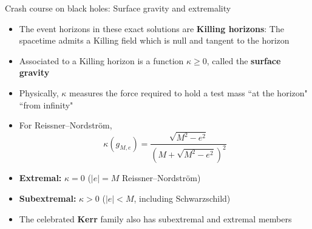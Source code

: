 \documentclass[compress,usenames,dvipsnames,8pt]{beamer}
\theoremstyle{definition}
\renewcommand{\(}{\begin{columns}}
\renewcommand{\)}{\end{columns}}
\newcommand{\<}[1]{\begin{column}{#1}}
\renewcommand{\>}{\end{column}}
\begin{document}






\begin{frame}{Crash course on black holes: Surface gravity and extremality}

\begin{itemize}
\item The event horizons in these exact solutions are \textbf{Killing horizons}: The spacetime admits a Killing field which is null and tangent to the horizon \pause

\item Associated to a Killing horizon is a function $\kappa\ge 0$, called the \textbf{surface gravity} \pause

\item Physically, $\kappa$ measures the force required to hold a test mass ``at the horizon" ``from infinity" \pause


\item For Reissner--Nordstr\"om, 
\[\kappa(g_{M,e})=\frac{\sqrt{M^2-e^2}}{(M+\sqrt{M^2-e^2})^2}\] \pause

\item \textbf{Extremal:} $\kappa = 0$ ($|e|=M$ Reissner--Nordstr\"om)

\item \textbf{Subextremal:} $\kappa>0$ ($|e|<M$, including Schwarzschild) \pause

\item The celebrated \textbf{Kerr} family also has subextremal and extremal members
\end{itemize}

\end{frame} 
\end{document}

